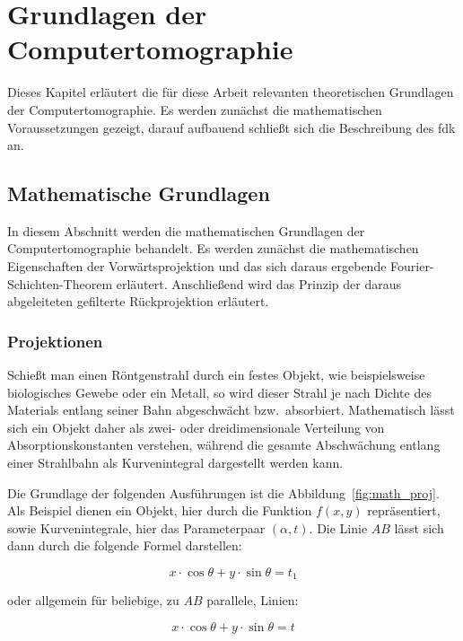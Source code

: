 \chapter{Grundlagen der Computertomographie}\label{chap:grundlagen_bp}

Dieses Kapitel erläutert die für diese Arbeit relevanten theoretischen Grundlagen der Computertomographie. Es werden
zunächst die mathematischen Voraussetzungen gezeigt, darauf aufbauend schließt sich die Beschreibung des \gls{fdk} an.

\section{Mathematische Grundlagen}

In diesem Abschnitt werden die mathematischen Grundlagen der Computertomographie behandelt. Es werden zunächst die
mathematischen Eigenschaften der Vorwärtsprojektion und das sich daraus ergebende Fourier-Schichten-Theorem erläutert.
Anschließend wird das Prinzip der daraus abgeleiteten gefilterte Rückprojektion erläutert.

\subsection{Projektionen}

Schießt man einen Röntgenstrahl durch ein festes Objekt, wie beispielsweise biologisches Gewebe oder ein Metall, so wird
dieser Strahl je nach Dichte des Materials entlang seiner Bahn abgeschwächt bzw.\ absorbiert. Mathematisch lässt sich
ein Objekt daher als zwei- oder dreidimensionale Verteilung von Absorptionskonstanten verstehen, während die gesamte
Abschwächung entlang einer Strahlbahn als Kurvenintegral dargestellt werden kann.

Die Grundlage der folgenden Ausführungen ist die Abbildung~\ref{fig:math_proj}. Als Beispiel dienen ein Objekt, hier
durch die Funktion $f(x, y)$ repräsentiert, sowie Kurvenintegrale, hier das Parameterpaar $(\alpha, t)$. Die Linie $AB$
lässt sich dann durch die folgende Formel darstellen:

\begin{equation*}
    x \cdot \cos \theta + y \cdot \sin \theta  = t_1
\end{equation*}

oder allgemein für beliebige, zu $AB$ parallele, Linien:

\begin{equation}\label{eq:proj_obj}
    x \cdot \cos \theta + y \cdot \sin \theta = t
\end{equation}

